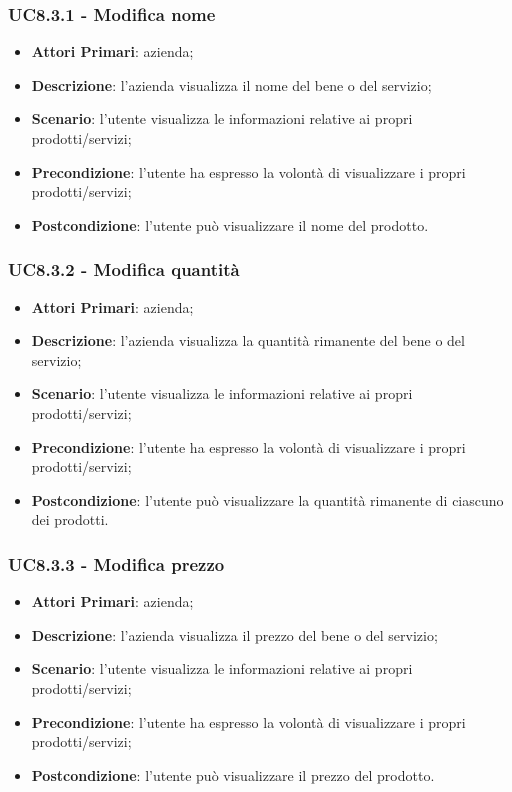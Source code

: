 \subsubsection{UC8.3.1 - Modifica nome}
\begin{itemize}
	\item \textbf{Attori Primari}: azienda;
	\item \textbf{Descrizione}: l'azienda visualizza il nome del bene o del servizio;
	\item \textbf{Scenario}: l'utente visualizza le informazioni relative ai propri prodotti/servizi;
	\item \textbf{Precondizione}: l'utente ha espresso la volontà di visualizzare i propri prodotti/servizi;
	\item \textbf{Postcondizione}: l'utente può visualizzare il nome del prodotto.
\end{itemize}

\subsubsection{UC8.3.2 - Modifica quantità}
\begin{itemize}
	\item \textbf{Attori Primari}: azienda;
	\item \textbf{Descrizione}: l'azienda visualizza la quantità rimanente del bene o del servizio;
	\item \textbf{Scenario}: l'utente visualizza le informazioni relative ai propri prodotti/servizi;
	\item \textbf{Precondizione}: l'utente ha espresso la volontà di visualizzare i propri prodotti/servizi;
	\item \textbf{Postcondizione}: l'utente può visualizzare la quantità rimanente di ciascuno dei prodotti.
\end{itemize}

\subsubsection{UC8.3.3 - Modifica prezzo}
\begin{itemize}
	\item \textbf{Attori Primari}: azienda;
	\item \textbf{Descrizione}: l'azienda visualizza il prezzo del bene o del servizio;
	\item \textbf{Scenario}: l'utente visualizza le informazioni relative ai propri prodotti/servizi;
	\item \textbf{Precondizione}: l'utente ha espresso la volontà di visualizzare i propri prodotti/servizi;
	\item \textbf{Postcondizione}: l'utente può visualizzare il prezzo del prodotto.
\end{itemize}

